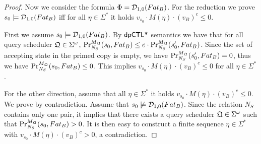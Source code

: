 \begin{proof}
Now we consider the formula  $\Phi = \dpriv{1}{0} (F at_B)$. For the reduction we prove $s_0\models \dpriv{1}{0} (F at_B)$ iff for all $\eta\in\Sigma^*$ it holds $v_{s_0}\cdot M(\eta)\cdot (v_B)^c \leq 0$.

First we assume $s_0\models \dpriv{1}{0} (F at_B)$. By $\dpCTLstar$ semantics we have that for all query scheduler $\scheduler{Q}\in\Sigma^\omega$,
$\myPr{s_0}{M_{\scheduler{Q}}}{\neighbor{S}}{F at_B} \leq
  e \cdot
  \myPr{s_0'}{M_{\scheduler{Q}}}{\neighbor{S}}{F at_B}$. Since the set of accepting state in the primed copy is empty, we have $\myPr{s_0'}{M_{\scheduler{Q}}}{\neighbor{S}}{F at_B}=0$, thus we have
$\myPr{s_0}{M_{\scheduler{Q}}}{\neighbor{S}}{F at_B} \leq
 0$. This implies  $v_{s_0}\cdot M(\eta)\cdot (v_B)^c \leq 0$ for all $\eta\in\Sigma^*$.

 For the other direction, assume that all $\eta\in\Sigma^*$ it holds $v_{s_0}\cdot M(\eta)\cdot (v_B)^c \leq 0$. We prove by contradiction. Assume that $s_0\not\models \dpriv{1}{0} (F at_B)$. Since the relation $N_S$ contains only one pair, it implies that there exists a query scheduler $\scheduler{Q}\in\Sigma^\omega$ such that $\myPr{s_0}{M_{\scheduler{Q}}}{\neighbor{S}}{F at_B} >0$. It is then easy to construct a finite sequence $\eta\in\Sigma^*$ with  $v_{s_0}\cdot M(\eta)\cdot (v_B)^c > 0$, a contradiction.
\end{proof}
